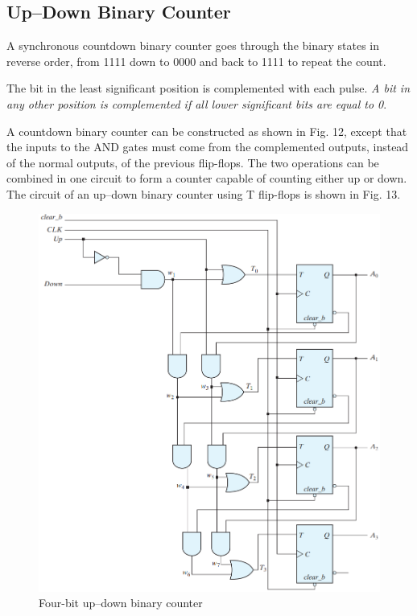 \subsection{Up–Down Binary Counter}
\label{subsec:up-down-binary-counter}

A synchronous countdown binary counter goes through the binary states in reverse order, from 1111 down to 0000 and back to 1111 to repeat the count.

The bit in the least significant position is complemented with each pulse. \textit{A bit in any other position is complemented if all lower significant bits are equal to 0}.

A countdown binary counter can be constructed as shown in Fig. 12, except that the inputs to the AND gates must come from the complemented outputs, instead of the normal outputs, of the previous flip-flops. The two operations can be combined in one circuit to form a counter capable of counting either up or down. The circuit of an up–down binary counter using T flip-flops is shown in Fig. 13.

\begin{figure}[H]
  \centering
  \includegraphics[width=\linewidth]{img/fig-6.13.png}
  \caption{Four-bit up–down binary counter}
  \label{fig:6.13}
\end{figure}


